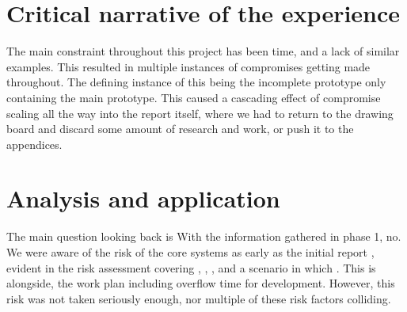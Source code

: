 %


\section{Critical narrative of the experience}\label{sec:challenges}
The main constraint throughout this project has been time, and a lack of similar examples. This resulted in multiple instances of compromises getting made throughout. The defining instance of this being the incomplete prototype only containing the main prototype. This caused a cascading effect of compromise scaling all the way into the report itself, where we had to return to the drawing board and discard some amount of research and work, or push it to the appendices.

\section{Analysis and application}\label{sec:reflection}
The main question looking back is  With the information gathered in phase 1, no. We were aware of the risk of the core systems as early as the initial report \citep{initial-report}, evident in the risk assessment covering , , , and a scenario in which . This is alongside, the work plan including overflow time for development. However, this risk was not taken seriously enough, nor multiple of these risk factors colliding.

